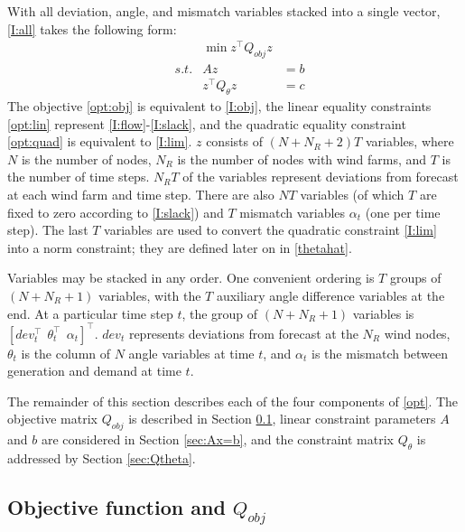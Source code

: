 \documentclass[conference]{IEEEtran}
\begin{document}
With all deviation, angle, and mismatch variables stacked into a single vector, \eqref{I:all} takes the following form:
\begin{subequations}\label{opt}
\begin{align}
\label{opt:obj}  &&  \min z^\top Q_{obj} z &\\
\label{opt:lin} & s.t. & Az &= b  \\
\label{opt:quad} &&  z^\top Q_{\theta}z &= c 
\end{align}
\end{subequations}
The objective \eqref{opt:obj} is equivalent to \eqref{I:obj}, the linear equality constraints \eqref{opt:lin} represent \eqref{I:flow}-\eqref{I:slack}, and the quadratic equality constraint \eqref{opt:quad} is equivalent to \eqref{I:lim}. $z$ consists of $(N+N_R+2)T$ variables, where $N$ is the number of nodes, $N_R$ is the number of nodes with wind farms, and $T$ is the number of time steps. $N_RT$ of the variables represent deviations from forecast at each wind farm and time step. There are also $NT$ variables (of which $T$ are fixed to zero according to \eqref{I:slack}) and $T$ mismatch variables $\alpha_t$ (one per time step). The last $T$ variables are used to convert the quadratic constraint \eqref{I:lim} into a norm constraint; they are defined later on in \eqref{thetahat}.

Variables may be stacked in any order. One convenient ordering is $T$ groups of $(N+N_R+1)$ variables, with the $T$ auxiliary angle difference variables at the end. At a particular time step $t$, the group of $(N+N_R+1)$ variables is $[dev_t^\top ~~ \theta_t^\top ~~ \alpha_t ]^\top$. $dev_t$ represents deviations from forecast at the $N_R$ wind nodes, $\theta_t$ is the column of $N$ angle variables at time $t$, and $\alpha_t$ is the mismatch between generation and demand at time $t$.

The remainder of this section describes each of the four components of \eqref{opt}. The objective matrix $Q_{obj}$ is described in Section \ref{sec:Qobj}, linear constraint parameters $A$ and $b$ are considered in Section \ref{sec:Ax=b}, and the constraint matrix $Q_{\theta}$ is addressed by Section \ref{sec:Qtheta}.

\subsection{Objective function and $Q_{obj}$}\label{sec:Qobj}
\end{document}
